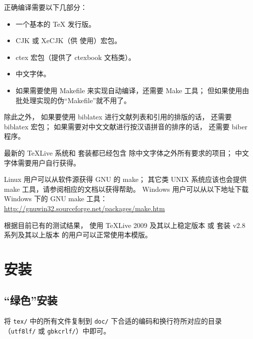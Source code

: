 	正确编译需要以下几部分：
	\begin{itemize}
		\item 一个基本的 \TeX{} 发行版。
		\item CJK 或 XeCJK（供  使用）宏包。
		\item ctex 宏包\supercite{ctex,ctex-faq}（提供了 ctexbook 文档类）。
		\item 中文字体。
		\item 如果需要使用 Makefile 来实现自动编译，还需要 Make 工具；
			但如果使用由批处理实现的伪“Makefile”就不用了。
	\end{itemize}
	除此之外，
	如果要使用 biblatex 进行文献列表和引用的排版的话，
	还需要 biblatex 宏包\supercite{biblatex}；
	如果需要对中文文献进行按汉语拼音的排序的话，
	还需要 biber 程序\supercite{biber}。

	最新的 \TeX{}Live 系统和 \CTeX{} 套装都已经包含%
	除中文字体之外所有要求的项目；
	中文字体需要用户自行获得。

	Linux 用户可以从软件源获得 GNU 的 make；
	其它类 UNIX 系统应该也会提供 make 工具，请参阅相应的文档以获得帮助。%
	Windows 用户可以从以下地址下载 Windows 下的 GNU make 工具：\\
	\hspace*{\parindent}%
	\url{http://gnuwin32.sourceforge.net/packages/make.htm}

	根据目前已有的测试结果，
	使用 \TeX{}Live 2009 及其以上稳定版本%
	或 \CTeX{} 套装 v2.8 系列及其以上版本
	的用户可以正常使用本模版。
	
	\section{安装}\label{sec:inst}
	\subsection{“绿色”安装}

	将 \verb|tex/| 中的所有文件复制到 %
	\verb|doc/| 下合适的编码和换行符所对应的目录%
	（\verb|utf8lf/| 或 \verb|gbkcrlf/|）中即可。

